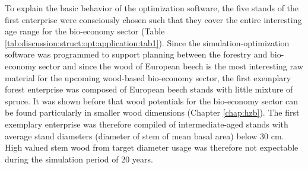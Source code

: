 To explain the basic behavior of the optimization software, the five stands of the first enterprise were consciously chosen such that they cover the entire interesting age range for the bio-economy sector (Table \ref{tab:discussion:struct:opt:application:tab1}). Since the simulation-optimization software was programmed to support planning between the forestry and bio-economy sector and since the wood of European beech is the most interesting raw material for the upcoming wood-based bio-economy sector, the first exemplary forest enterprise was composed of European beech stands with little mixture of spruce. It was shown before that wood potentials for the bio-economy sector can be found particularly in smaller wood dimensions (Chapter \ref{chap:hzb}). The first exemplary enterprise was therefore compiled of intermediate-aged stands with average stand diameters (diameter of stem of mean basal area) below 30 cm. High valued stem wood from target diameter usage was therefore not expectable during the simulation period of 20 years.

